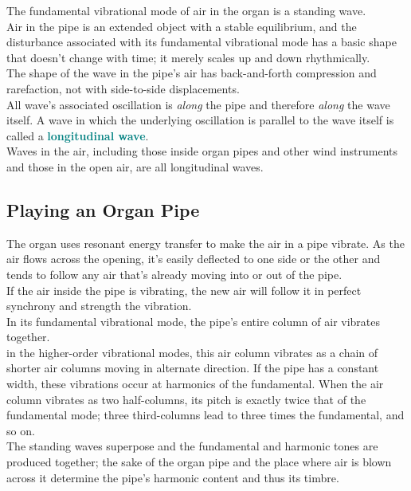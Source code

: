 \documentclass[12pt]{article}
\theoremstyle{definition}
\newcommand{\defnterm}[1]{\textbf{\textcolor{teal}{#1}}\index{#1}}
\begin{document}
The fundamental vibrational mode of air in the organ is a standing wave. \\
Air in the pipe is an extended object with a stable equilibrium, and the disturbance associated with its fundamental vibrational mode has a basic shape that doesn't change with time;
it merely scales up and down rhythmically. \\

The shape of the wave in the pipe's air has back-and-forth compression and rarefaction, not with side-to-side displacements. \\
All wave's associated oscillation is \emph{along} the pipe and therefore \emph{along} the wave itself.
A wave in which the underlying oscillation is parallel to the wave itself is called a \defnterm{longitudinal wave}. \\
Waves in the air, including those inside organ pipes and other wind instruments and those in the open air, are all longitudinal waves. \\

\subsection{Playing an Organ Pipe}
The organ uses resonant energy transfer to make the air in a pipe vibrate.
As the air flows across the opening, it's easily deflected to one side or the other and tends to follow any air that's already moving into or out of the pipe. \\
If the air inside the pipe is vibrating, the new air will follow it in perfect synchrony and strength the vibration. \\

In its fundamental vibrational mode, the pipe's entire column of air vibrates together. \\
in the higher-order vibrational modes, this air column vibrates as a chain of shorter air columns moving in alternate direction.
If the pipe has a constant width, these vibrations occur at harmonics of the fundamental.
When the air column vibrates as two half-columns, its pitch is exactly twice that of the fundamental mode;
three third-columns lead to three times the fundamental, and so on. \\

The standing waves superpose and the fundamental and harmonic tones are produced together;
the sake of the organ pipe and the place where air is blown across it determine the pipe's harmonic content and thus its timbre.
\end{document}

